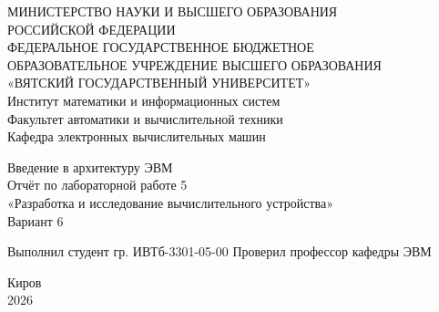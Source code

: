 \documentclass[oneside,a4paper,14pt]{extarticle}
\begin{document}
\newpage\thispagestyle{empty}
\begin{center}
	МИНИСТЕРСТВО НАУКИ И ВЫСШЕГО ОБРАЗОВАНИЯ\\
	РОССИЙСКОЙ ФЕДЕРАЦИИ\\
	ФЕДЕРАЛЬНОЕ ГОСУДАРСТВЕННОЕ БЮДЖЕТНОЕ\\
	ОБРАЗОВАТЕЛЬНОЕ УЧРЕЖДЕНИЕ ВЫСШЕГО ОБРАЗОВАНИЯ\\
	«ВЯТСКИЙ ГОСУДАРСТВЕННЫЙ УНИВЕРСИТЕТ»\\
	Институт математики и информационных систем\\
	Факультет автоматики и вычислительной техники\\
	Кафедра электронных вычислительных машин
\end{center}
\vspace{20mm}
\begin{center}
	Введение в архитектуру ЭВМ\\
	Отчёт по лабораторной работе 5\\
	«Разработка и исследование вычислительного устройства»\\
	Вариант 6
\end{center}
\vfill
Выполнил студент гр. ИВТб-3301-05-00 \hfill
{}
Проверил профессор кафедры ЭВМ\hfill
{}
\vfill
\begin{center}
	Киров\\
	2026
\end{center}
\end{document}
